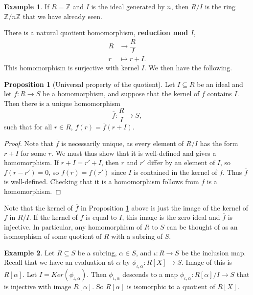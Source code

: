 \documentclass{article}
\newcommand{\Z}{\mathbb{Z}}
\newcommand{\rb}[1]{\left( #1 \right)}
\renewcommand{\sb}[1]{\left[ #1 \right]}
\theoremstyle{definition}\newtheorem{definition}{Definition}[subsection]
\theoremstyle{definition}\newtheorem{remark}[definition]{Remark}
\theoremstyle{definition}\newtheorem*{example}{Example}
\theoremstyle{definition}\newtheorem*{note}{Note}
\newtheorem{proposition}[definition]{Proposition}
\begin{document}
\begin{example}
If $ R = \Z $ and $ I $ is the ideal generated by $ n $, then $ R / I $ is the ring $ \Z / n\Z $ that we have already seen.
\end{example}

There is a natural quotient homomorphism, \textbf{reduction mod $ I $},
\begin{align*}
R & \to \dfrac{R}{I} \\
r & \mapsto r + I.
\end{align*}
This homomorphism is surjective with kernel $ I $. We then have the following.

\begin{proposition}[Universal property of the quotient]
\label{prop:2.5.1}
Let $ I \subseteq R $ be an ideal and let $ f : R \to S $ be a homomorphism, and suppose that the kernel of $ f $ contains $ I $. Then there is a unique homomorphism
$$ \overline{f} : \dfrac{R}{I} \to S, $$
such that for all $ r \in R $, $ f\rb{r} = \overline{f}\rb{r + I} $.
\end{proposition}

\begin{proof}
Note that $ \overline{f} $ is necessarily unique, as every element of $ R / I $ has the form $ r + I $ for some $ r $. We must thus show that it is well-defined and gives a homomorphism. If $ r + I = r' + I $, then $ r $ and $ r' $ differ by an element of $ I $, so $ f\rb{r - r'} = 0 $, so $ f\rb{r} = f\rb{r'} $ since $ I $ is contained in the kernel of $ f $. Thus $ \overline{f} $ is well-defined. Checking that it is a homomorphism follows from $ f $ is a homomorphism.
\end{proof}

Note that the kernel of $ \overline{f} $ in Proposition \ref{prop:2.5.1} above is just the image of the kernel of $ f $ in $ R / I $. If the kernel of $ f $ is equal to $ I $, this image is the zero ideal and $ \overline{f} $ is injective. In particular, any homomorphism of $ R $ to $ S $ can be thought of as an isomorphism of some quotient of $ R $ with a subring of $ S $.

\begin{example}
Let $ R \subseteq S $ be a subring, $ \alpha \in S $, and $ \iota : R \to S $ be the inclusion map. Recall that we have an evaluation at $ \alpha $ by $ \phi_{\iota, \alpha} : R\sb{X} \to S $. Image of this is $ R\sb{\alpha} $. Let $ I = Ker\rb{\phi_{\iota, \alpha}} $. Then $ \phi_{\iota, \alpha} $ descends to a map $ \phi_{\iota, \alpha} : R\sb{\alpha} / I \to S $ that is injective with image $ R\sb{\alpha} $. So $ R\sb{\alpha} $ is isomorphic to a quotient of $ R\sb{X} $.
\end{example}
\end{document}
